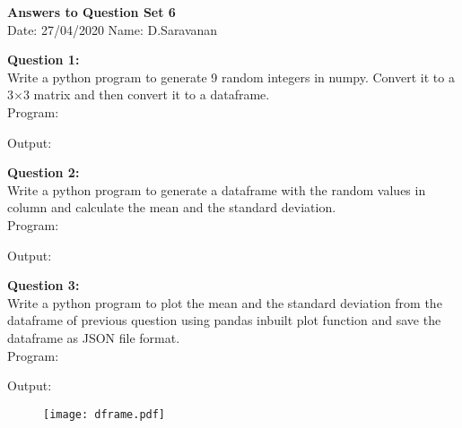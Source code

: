 \documentclass[a4paper,11pt,openright]{report}
\begin{document}
\singlespacing
\pagestyle{plain}

\begin{center}
\textbf{Answers to Question Set 6} \\
Date: 27/04/2020 \hspace{2mm} Name: D.Saravanan
\end{center}

\vspace{10px}

\textbf{Question 1:} \\
Write a python program to generate 9 random integers in numpy. Convert it to a 3$\times$3 matrix 
and then convert it to a dataframe. \\

Program: 


\vspace{5px}

Output:


\vspace{10px}

\textbf{Question 2:} \\
Write a python program to generate a dataframe with the random values in column and 
calculate the mean and the standard deviation. \\

Program:


\vspace{5px}

\pagebreak

Output:


\vspace{10px}

\textbf{Question 3:} \\
Write a python program to plot the mean and the standard deviation from the dataframe of
previous question using pandas inbuilt plot function and save the dataframe as JSON file 
format.\\

Program:


\vspace{10px}

Output:

\begin{figure}[ht!]
\texttt{[image: dframe.pdf]}
\end{figure}
\end{document}
